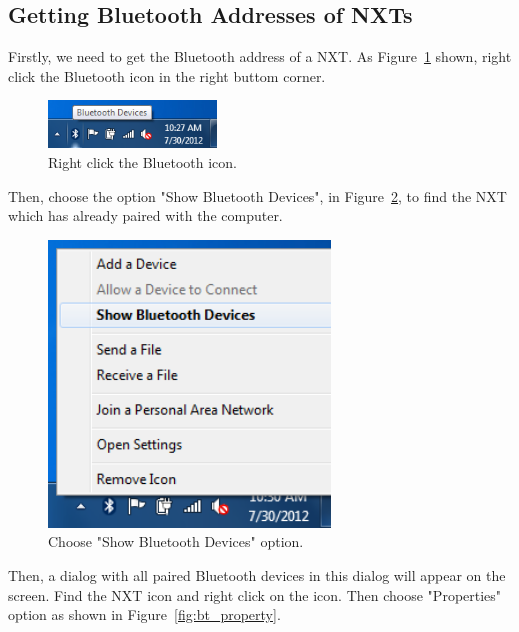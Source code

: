 \documentclass[11pt]{article}
\begin{document}
\subsection{Getting Bluetooth Addresses of NXTs}
Firstly, we need to get the Bluetooth address of a NXT. As Figure~\ref{fig:bt_device} shown, right click
the Bluetooth icon in the right buttom corner.

\begin{figure}[H]
  \begin{center}
    \includegraphics[height=0.5in]{figure/configuration/getBTaddress/bt1.png}
    \caption{Right click the Bluetooth icon.\label{fig:bt_device}}
  \end{center}
\end{figure}

Then, choose the option "Show Bluetooth Devices", in Figure~\ref{fig:bt_show_device}, to find the NXT which 
has already paired with the computer.

\begin{figure}[H]
  \begin{center}
    \includegraphics[height=3in]{figure/configuration/getBTaddress/btShowDevices.png}
    \caption{Choose "Show Bluetooth Devices" option.\label{fig:bt_show_device}}
  \end{center}
\end{figure}

Then, a dialog with all paired Bluetooth devices in this dialog will appear on the screen. Find the NXT icon
and right click on the icon. Then choose "Properties" option as shown in Figure~\ref{fig:bt_property}.
\end{document}
